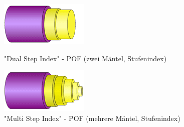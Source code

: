\begin{figure}[h]
    \begin{center}
        \begin{minipage}[t]{0.4\textwidth}
            \begin{center}
                \includegraphics[height=0.1\textheight]{Bilder/Optische_Wellenleiter_Die_polymer_optische_Faser/Brechzahlprofile/pofdsi.png}
                \caption["Dual
                Step Index" - POF (zwei Mäntel, Stufenindex)
                \newline
                \url{POFAC}]{"Dual
                Step Index" - POF (zwei Mäntel, Stufenindex)}
                \label{fig:pofdsi}
            \end{center}
        \end{minipage}
        \hspace{0.025\textwidth}
        \begin{minipage}[t]{0.4\textwidth}
            \begin{center}
                \includegraphics[height=0.1\textheight]{Bilder/Optische_Wellenleiter_Die_polymer_optische_Faser/Brechzahlprofile/pofmsi.png}
                \caption["Multi
                Step Index" - POF (mehrere Mäntel, Stufenindex)
                \newline
                \url{POFAC}]{"Multi
                Step Index" - POF (mehrere Mäntel, Stufenindex)}
                \label{fig:pofmsi}
            \end{center}
        \end{minipage}
    \end{center}


\end{figure}
